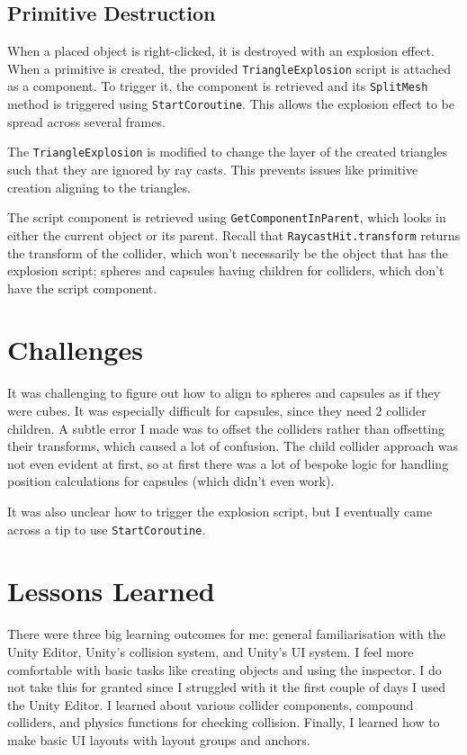\documentclass[a4paper, 12pt]{scrartcl}
\begin{document}
\subsection{Primitive Destruction}
When a placed object is right-clicked, it is destroyed with an explosion effect. When a primitive is created, the provided \texttt{TriangleExplosion} script is attached as a component. To trigger it, the component is retrieved and its \texttt{SplitMesh} method is triggered using \texttt{StartCoroutine}. This allows the explosion effect to be spread across several frames.

The \texttt{TriangleExplosion} is modified to change the layer of the created triangles such that they are ignored by ray casts. This prevents issues like primitive creation aligning to the triangles.

The script component is retrieved using \texttt{GetComponentInParent}, which looks in either the current object or its parent. Recall that \texttt{RaycastHit.transform} returns the transform of the collider, which won't necessarily be the object that has the explosion script; spheres and capsules having children for colliders, which don't have the script component.

\section{Challenges}
It was challenging to figure out how to align to spheres and capsules as if they were cubes. It was especially difficult for capsules, since they need 2 collider children. A subtle error I made was to offset the colliders rather than offsetting their transforms, which caused a lot of confusion. The child collider approach was not even evident at first, so at first there was a lot of bespoke logic for handling position calculations for capsules (which didn't even work).

It was also unclear how to trigger the explosion script, but I eventually came across a tip to use \texttt{StartCoroutine}.

\section{Lessons Learned}
There were three big learning outcomes for me: general familiarisation with the Unity Editor, Unity's collision system, and Unity's UI system. I feel more comfortable with basic tasks like creating objects and using the inspector. I do not take this for granted since I struggled with it the first couple of days I used the Unity Editor. I learned about various collider components, compound colliders, and physics functions for checking collision. Finally, I learned how to make basic UI layouts with layout groups and anchors.
\end{document}
